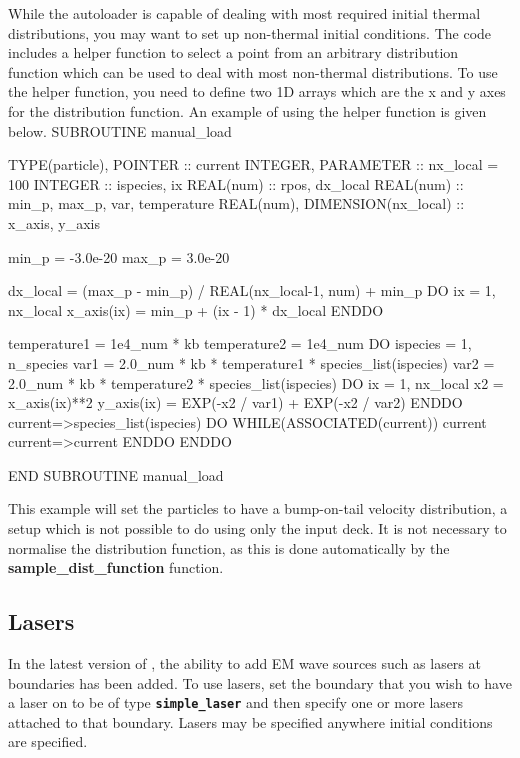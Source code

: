 \documentclass[12pt,a4paper]{article}
\newcommand{\inlinecode}[1]{{\color{warwickred} \bf\texttt{#1}}}
\newcommand{\EPOCH}{{\color{warwickdark}\fontfamily{phv}\selectfont{EPOCH}}}
\newenvironment{boxverbatim}{\lboxverbatim{none}}{\endlboxverbatim}
\begin{document}
While the autoloader is capable of dealing with most required initial thermal
distributions, you may want to set up non-thermal initial conditions. The code
includes a helper function to select a point from an arbitrary distribution
function which can be used to deal with most non-thermal distributions. To use
the helper function, you need to define two 1D arrays which are the x and
y axes for the distribution function. An example of using the helper function
is given below.
\begin{boxverbatim}
SUBROUTINE manual_load

  TYPE(particle), POINTER :: current
  INTEGER, PARAMETER :: nx_local = 100
  INTEGER :: ispecies, ix
  REAL(num) :: rpos, dx_local
  REAL(num) :: min_p, max_p, var, temperature
  REAL(num), DIMENSION(nx_local) :: x_axis, y_axis

  min_p = -3.0e-20
  max_p = 3.0e-20

  dx_local = (max_p - min_p) / REAL(nx_local-1, num) + min_p
  DO ix = 1, nx_local
    x_axis(ix) = min_p + (ix - 1) * dx_local
  ENDDO

  temperature1 = 1e4_num * kb
  temperature2 = 1e4_num
  DO ispecies = 1, n_species
    var1 = 2.0_num * kb * temperature1 * species_list(ispecies)%
    var2 = 2.0_num * kb * temperature2 * species_list(ispecies)%
    DO ix = 1, nx_local
      x2 = x_axis(ix)**2
      y_axis(ix) = EXP(-x2 / var1) + EXP(-x2 / var2)
    ENDDO
    current=>species_list(ispecies)%
    DO WHILE(ASSOCIATED(current))
      current%
      current=>current%
    ENDDO
  ENDDO

END SUBROUTINE manual_load
\end{boxverbatim}

This example will set the particles to have a bump-on-tail velocity
distribution, a setup which is not possible to do using only the
input deck. It is not necessary to normalise
the distribution function, as this is done automatically by the
{\bf sample\_dist\_function} function.


\subsection{Lasers}
In the latest version of {\EPOCH}, the ability to add EM wave sources such as
lasers at boundaries has been added. To use lasers, set the boundary that you
wish to have a laser on to be of type \inlinecode{simple\_laser} and then
specify one or more lasers attached to that boundary. Lasers may be specified
anywhere initial conditions are specified.
\end{document}
